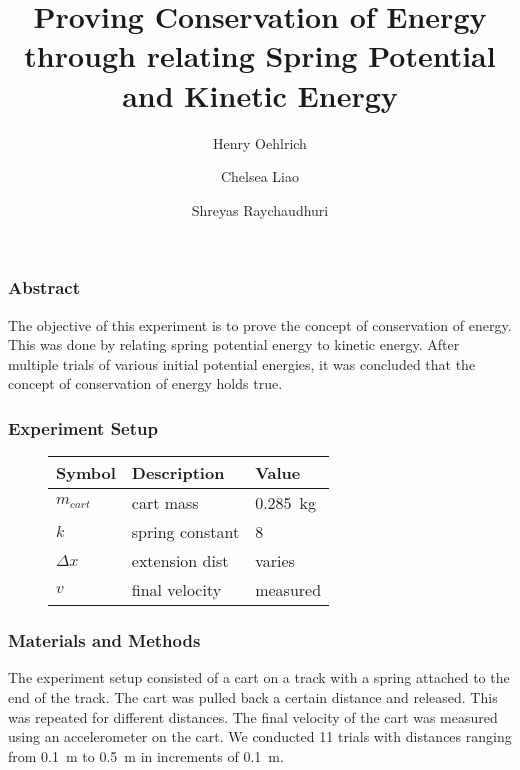 \documentclass{beamer}
\title{Proving Conservation of Energy through relating Spring Potential and Kinetic Energy}
\author{Henry Oehlrich\and Chelsea Liao\and Shreyas Raychaudhuri}
\begin{document}
\maketitle

\begin{frame}
    \frametitle{Abstract}
    The objective of this experiment is to prove the concept of conservation of
    energy. This was done by relating spring potential energy to kinetic
    energy. After multiple trials of various initial potential energies, it was
    concluded that the concept of conservation of energy holds true.
\end{frame}

\begin{frame}
    \frametitle{Experiment Setup}
    \begin{figure}
        \centering
    \end{figure}
    \begin{figure}
        \centering
        \begin{tabular}{l|l|l}
            \toprule
            Symbol & Description &  Value \\
            \midrule
            $m_{cart}$ & cart mass & \qty{0.285}{\kg} \\
            $k$ & spring constant & 8 \\
            $\Delta x$ & extension dist & varies \\
            $v$ & final velocity & measured \\
        \end{tabular}
    \end{figure}
\end{frame}

\begin{frame}
    \frametitle{Materials and Methods}
    The experiment setup consisted of a cart on a track with a spring attached
    to the end of the track. The cart was pulled back a certain distance and
    released. This was repeated for different distances. The final velocity of
    the cart was measured using an accelerometer on the cart. We conducted 11
    trials with distances ranging from \qty{0.1}{\m} to \qty{0.5}{\m} in
    increments of \qty{0.1}{\m}.
\end{frame}
\end{document}
